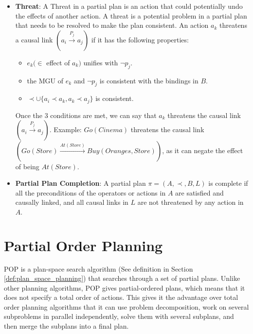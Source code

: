 \begin{itemize}
      \item  \label{def:threat}
            \textbf{Threat}: A Threat in a partial plan is an action that could potentially undo the effects of another action. A threat is a potential problem in a partial plan that needs to be resolved to make the plan consistent. An action $a_k$ threatens a causal link $(a_i \xrightarrow{\text{$P_j$}}  a_j)$ if it has the following properties:
            \begin{itemize}
                  \item $e_k (\in$ effect of $a_k)$ unifies with $\lnot p_j$.
                  \item the \ac{MGU} of $e_k$ and $\lnot p_j$ is consistent with the bindings in $B$.
                  \item $\prec \cup \{a_i \prec a_k, a_k \prec a_j\}$ is consistent.
            \end{itemize}
            Once the 3 conditions are met, we can say that $a_k$ threatens the causal link $(a_i \xrightarrow{\text{$P_j$}}  a_j)$.
            Example: $Go(Cinema)$ threatens the causal link $(Go(Store) \xrightarrow{\text{$At(Store)$}} Buy(Oranges,Store))$, as it can negate the effect of being $At(Store)$.

      \item  \label{def:partial_plan_completion}
            \textbf{Partial Plan Completion}: A partial plan $\pi = (A, \prec, B, L)$ is complete if all the preconditions of the operators or actions in $A$ are satisfied and causally linked, and all causal links in $L$ are not threatened by any action in $A$.

\end{itemize}








\section{Partial Order Planning} \label{sec:partial_order_planning}
\acf{POP} is a plan-space search algorithm (See definition in Section \ref{def:plan_space_planning}) that searches through a set of partial plans.
Unlike other planning algorithms, \ac{POP} gives partial-ordered plans, which means that it does not specify a total order of actions.
This gives it the advantage over total order planning algorithms that it can use problem decomposition, work
on several subproblems in parallel independently, solve them with several subplans, and then merge the subplans into a final plan.


